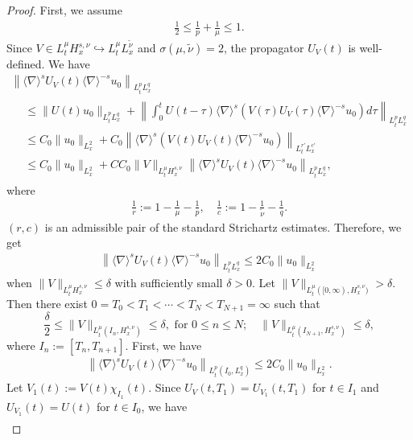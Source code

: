 \documentclass[10pt,a4paper]{amsart}
\providecommand{\No}[1]{\left\| #1 \right\|}
\newcommand{\de}{\delta}
\newcommand{\ta}{\tau}
\newcommand{\si}{\sigma}
\newcommand{\ch}{\chi}
\newcommand{\wt}{\widetilde}
\newcommand{\K}[1]{\left(#1\right)}
\renewcommand{\No}[1]{\left\| #1 \right\|}
\newcommand{\I}{\infty}
\newcommand{\sd}{\langle \nabla \rangle}
\newcommand{\tw}{\frac{1}{2}}
\begin{document}
\begin{proof}
First, we assume
\begin{align}
\tw \le \frac{1}{p} + \frac{1}{\mu} \le 1.
\end{align}
Since $V \in L^\mu_t H^{s,\nu}_x \hookrightarrow L^\mu_t L^{\wt{\nu}}_x$ and $\si(\mu,\wt{\nu})=2$, the propagator $U_V(t)$ is well-defined. We have
\begin{multline}
\left\|\sd^s U_V(t)\sd^{-s}u_0\right\|_{L^p_t L^q_x}\\
\begin{aligned}
&\le \|U(t)u_0\|_{L^p_t L^q_x} + \No{\int_0^t U(t-\ta)\sd^s \left(V(\ta)U_V(\ta) \sd^{-s} u_0\right) d\ta}_{L^p_t L^q_x} \\
&\le C_0\|u_0\|_{L^2_x} + C_0\No{\sd^s \K{ V(t)U_V(t) \sd^{-s} u_0}}_{L^{r'}_t L^{c'}_x} \\
&\le C_0\|u_0\|_{L^2_x} + CC_0\|V\|_{L^\mu_t H^{s,\nu}_x} \left\|\sd^s U_V(t) \sd^{-s} u_0\right\|_{L^p_t L^q_x},
\end{aligned}
\end{multline}
where
\begin{align}
\frac{1}{r}:= 1-\frac{1}{\mu}-\frac{1}{p},
\quad \frac{1}{c} := 1 - \frac{1}{\wt{\nu}} - \frac{1}{q}.
\end{align}
$(r,c)$ is an admissible pair of the standard Strichartz estimates. Therefore, we get
\begin{align}
\left\|\sd^s U_V(t)\sd^{-s}u_0\right\|_{L^p_t L^q_x} \le 2C_0 \|u_0\|_{L^2_x}
\end{align}
when $\|V\|_{L^\mu_t H^{s,\nu}_x} \le \de$ with sufficiently small $\de>0$. Let $\|V\|_{L^\mu_t([0,\I),H^{s,\nu}_x)} > \de$. Then there exist $0=T_0 < T_1 < \cdots < T_N < T_{N+1} = \I$ such that
\begin{equation}\label{N}
\frac{\de}{2} \le \|V\|_{L^\mu_t\left(I_n, H^{s,\nu}_x\right)} \le \de, \text{ for } 0 \le n \le N; \quad
\|V\|_{L^\mu_t\left(I_{N+1}, H^{s,\nu}_x\right)} \le \de, 
\end{equation}
where $I_n := [T_n,T_{n+1}]$. First, we have
\begin{align}
\left\|\sd^sU_V(t)\sd^{-s} u_0\right\|_{L^p_t\left(I_0,L^q_x\right)}
\le 2C_0
\|u_0\|_{L^2_x}.
\end{align}
Let $V_1(t):= V(t) \ch_{I_1}(t)$. Since $U_V(t,T_1) = U_{V_1}(t,T_1)$ for $t \in I_1$ and $U_{V_1}(t) = U(t)$ for $t \in I_0$, we have
\begin{align}\label{UV ext}

\end{align}
\end{proof}
\end{document}
